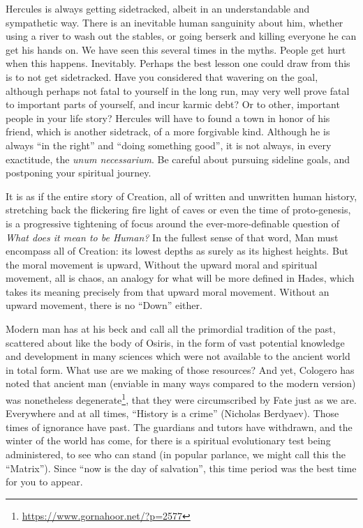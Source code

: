Hercules is always getting sidetracked, albeit in an understandable and sympathetic way. There is an inevitable human sanguinity about him, whether using a river to wash out the stables, or going berserk and killing everyone he can get his hands on. We have seen this several times in the myths. People get hurt when this happens. Inevitably. Perhaps the best lesson one could draw from this is to not get sidetracked. Have you considered that wavering on the goal, although perhaps not fatal to yourself in the long run, may very well prove fatal to important parts of yourself, and incur karmic debt? Or to other, important people in your life story? Hercules will have to found a town in honor of his friend, which is another sidetrack, of a more forgivable kind. Although he is always ``in the right'' and ``doing something good'', it is not always, in every exactitude, the \emph{unum necessarium}. Be careful about pursuing sideline goals, and postponing your spiritual journey.

It is as if the entire story of Creation, all of written and unwritten human history, stretching back the flickering fire light of caves or even the time of proto-genesis, is a progressive tightening of focus around the ever-more-definable question of \emph{What does it mean to be Human?} In the fullest sense of that word, Man must encompass all of Creation: its lowest depths as surely as its highest heights. But the moral movement is upward, Without the upward moral and spiritual movement, all is chaos, an analogy for what will be more defined in Hades, which takes its meaning precisely from that upward moral movement. Without an upward movement, there is no ``Down'' either.

Modern man has at his beck and call all the primordial tradition of the past, scattered about like the body of Osiris, in the form of vast potential knowledge and development in many sciences which were not available to the ancient world in total form. What use are we making of those resources? And yet, Cologero has noted that ancient man (enviable in many ways compared to the modern version) was nonetheless degenerate\footnote{\url{https://www.gornahoor.net/?p=2577}}, that they were circumscribed by Fate just as we are. Everywhere and at all times, ``History is a crime'' (Nicholas Berdyaev). Those times of ignorance have past. The guardians and tutors have withdrawn, and the winter of the world has come, for there is a spiritual evolutionary test being administered, to see who can stand (in popular parlance, we might call this the ``Matrix''). Since ``now is the day of salvation'', this time period was the best time for you to appear.

